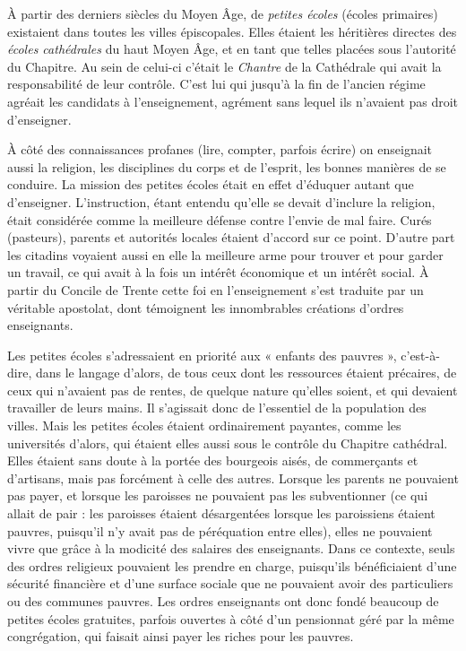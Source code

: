  À partir des derniers siècles du Moyen Âge, de \emph{petites écoles} (écoles primaires) existaient dans toutes les villes épiscopales. Elles étaient les héritières directes des \emph{écoles cathédrales} du haut Moyen Âge, et en tant que telles placées sous l'autorité du Chapitre. Au sein de celui-ci c'était le \emph{Chantre} de la Cathédrale qui avait la responsabilité de leur contrôle. C'est lui qui jusqu'à la fin de l'ancien régime agréait les candidats à l'enseignement, agrément sans lequel ils n'avaient pas droit d'enseigner. 

 À côté des connaissances profanes (lire, compter, parfois écrire) on enseignait aussi la religion, les disciplines du corps et de l'esprit, les bonnes manières de se conduire. La mission des petites écoles était en effet d'éduquer autant que d'enseigner. L'instruction, étant entendu qu'elle se devait d'inclure la religion, était considérée comme la meilleure défense contre l'envie de mal faire. Curés (pasteurs), parents et autorités locales étaient d'accord sur ce point. D'autre part les citadins voyaient aussi en elle la meilleure arme pour trouver et pour garder un travail, ce qui avait à la fois un intérêt économique et un intérêt social. À partir du Concile de Trente cette foi en l'enseignement s'est traduite par un véritable apostolat, dont témoignent les innombrables créations d'ordres enseignants. 

 Les petites écoles s'adressaient en priorité aux « enfants des pauvres », c'est-à-dire, dans le langage d'alors, de tous ceux dont les ressources étaient précaires, de ceux qui n'avaient pas de rentes, de quelque nature qu'elles soient, et qui devaient travailler de leurs mains. Il s'agissait donc de l'essentiel de la population des villes. Mais les petites écoles étaient ordinairement payantes, comme les universités d'alors, qui étaient elles aussi sous le contrôle du Chapitre cathédral. Elles étaient sans doute à la portée des bourgeois aisés, de commerçants et d'artisans, mais pas forcément à celle des autres. Lorsque les parents ne pouvaient pas payer, et lorsque les paroisses ne pouvaient pas les subventionner (ce qui allait de pair : les paroisses étaient désargentées lorsque les paroissiens étaient pauvres, puisqu'il n'y avait pas de péréquation entre elles), elles ne pouvaient vivre que grâce à la modicité des salaires des enseignants. Dans ce contexte, seuls des ordres religieux pouvaient les prendre en charge, puisqu'ils bénéficiaient d'une sécurité financière et d'une surface sociale que ne pouvaient avoir des particuliers ou des communes pauvres. Les ordres enseignants ont donc fondé beaucoup de petites écoles gratuites, parfois ouvertes à côté d'un pensionnat géré par la même congrégation, qui faisait ainsi payer les riches pour les pauvres. 

